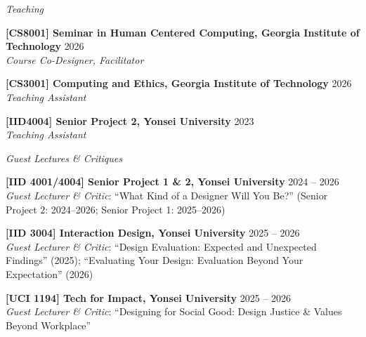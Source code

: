 \noindent \textit{Teaching}\\

\vspace{-0.25cm}

\noindent\textbf{[CS8001] Seminar in Human Centered Computing, Georgia Institute of Technology} \hfill{2026}\\
\textit{Course Co-Designer, Facilitator} \\

\vspace{-0.25cm}

\noindent\textbf{[CS3001] Computing and Ethics, Georgia Institute of Technology} \hfill{2026}\\
\textit{Teaching Assistant} \\

\vspace{-0.25cm}

\noindent\textbf{[IID4004] Senior Project 2, Yonsei 
University} \hfill{2023}\\
\textit{Teaching Assistant} \\

\vspace{-0.1cm}

\noindent \textit{Guest Lectures \& Critiques}\\

\vspace{-0.25cm}

\noindent\textbf{[IID 4001/4004] Senior Project 1 \& 2, Yonsei University} \hfill{2024 -- 2026}\\
\textit{Guest Lecturer \& Critic}: ``What Kind of a Designer Will You Be?'' (Senior Project 2: 2024--2026; Senior Project 1: 2025--2026) \\

\vspace{-0.25cm}

\noindent\textbf{[IID 3004] Interaction Design, Yonsei University} \hfill{2025 -- 2026}\\
\textit{Guest Lecturer \& Critic}: ``Design Evaluation: Expected and Unexpected Findings'' (2025); ``Evaluating Your Design: Evaluation Beyond Your Expectation'' (2026) \\

\vspace{-0.25cm}

\noindent\textbf{[UCI 1194] Tech for Impact, Yonsei University} \hfill{2025 -- 2026}\\
\textit{Guest Lecturer \& Critic}: ``Designing for Social Good: Design Justice \& Values Beyond Workplace'' \\

